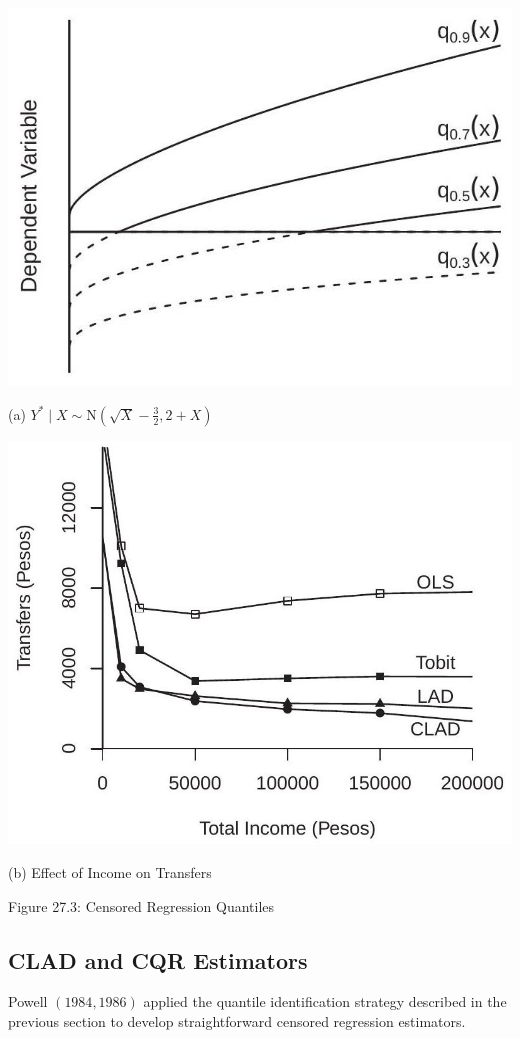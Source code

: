 \documentclass[10pt]{article}
\begin{document}
\includegraphics[max width=\textwidth]{2022_10_23_36a5c875f975c7792a09g-08}

(a) $Y^{*} \mid X \sim \mathrm{N}\left(\sqrt{X}-\frac{3}{2}, 2+X\right)$

\includegraphics[max width=\textwidth]{2022_10_23_36a5c875f975c7792a09g-08(1)}

(b) Effect of Income on Transfers

Figure 27.3: Censored Regression Quantiles

\subsection{CLAD and CQR Estimators}
Powell $(1984,1986)$ applied the quantile identification strategy described in the previous section to develop straightforward censored regression estimators.
\end{document}

